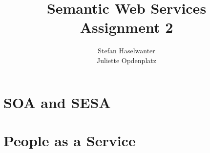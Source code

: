 \documentclass[a4paper]{article}
\title{\textbf{Semantic Web Services}\\\large{Assignment 2}}
\author{Stefan Haselwanter\\Juliette Opdenplatz}
\begin{document}
\maketitle


\section{SOA and SESA}

\section{People as a Service}
\end{document}
